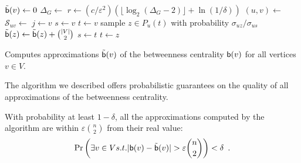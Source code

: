 \begin{algorithm}[h]
   \DontPrintSemicolon
  {
  $\tilde{\mathsf{b}}(v)\leftarrow 0$
  }
  $\Delta_G\leftarrow$\label{alg:diamcomp}\; 
  $r\leftarrow (c/\varepsilon^2)(\lfloor\log_2(\Delta_G-2)\rfloor+\ln(1/\delta))$\;
  {\label{algline:forloop}
  $(u,v)\leftarrow$\;
  $\mathcal{S}_{uv}\leftarrow$\;
  {
  $j\leftarrow v$\;
  $s\leftarrow v$\;
  $t\leftarrow v$\;
   {
  sample $z\in P_u(t)$ with probability $\sigma_{uz}/\sigma_{us}$\;
   {
  $\tilde{\mathsf{b}}(z) \leftarrow \tilde{\mathsf{b}}(z)+\binom{|V|}{2}$\;
  $s\leftarrow t$\;
  $t\leftarrow z$\;
  }
  }
  }
  } %
  \caption{Computes approximations $\tilde{\mathsf{b}}(v)$ of the betweenness
  centrality $\mathsf{b}(v)$ for all vertices $v\in V$.}
  \label{alg:algorithm}
\end{algorithm}

The algorithm we described offers probabilistic guarantees on the quality of all
approximations of the betweenness centrality.
\begin{lemma}\label{lem:correctness}
  With probability at least $1-\delta$, all the approximations computed by the
  algorithm are within $\varepsilon\binom{n}{2}$ from their real value:
  \[
  \Pr\left(\exists v\in V \mbox{ s.t. }
  |\betw(v)-\tilde\betw(v)|>\varepsilon\binom{n}{2}\right)<\delta\enspace .
  \]
\end{lemma}

